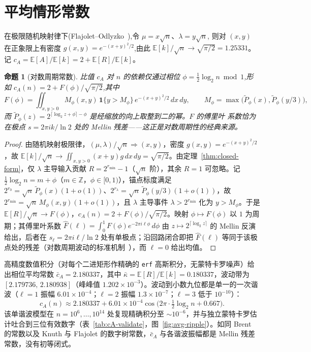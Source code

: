 \documentclass[11pt]{ctexart}
\newtheorem{proposition}[theorem]{命题}
\begin{document}
\section{平均情形常数}
\label{sec:average}

在极限随机映射律下(Flajolet--Odlyzko~\cite{flajolet}),令 $\mu=x\sqrt n$、$\lambda=y\sqrt n$,
则对 $(x,y)$ 在正象限上有密度 $g(x,y)=e^{-(x+y)^2/2}$,由此
$\mathbb E[k]/\sqrt n\to\sqrt{\pi/2}=1.25331$。记
$c_A=\mathbb E[A]/\mathbb E[k]=2+\mathbb E[R]/\mathbb E[k]$。

\begin{proposition}[对数周期常数]
\label{prop:cA}
比值 $c_A$ 对 $n$ 的依赖仅通过相位 $\phi=\tfrac12\log_2 n\bmod 1$,形如
$c_A(n)=2+F(\phi)/\sqrt{\pi/2}$,其中
\[
F(\phi)=\iint_{x,y>0} M_\phi(x,y)\,\mathbf 1\{y>M_\phi\}\,e^{-(x+y)^2/2}\,dx\,dy,
\qquad M_\phi=\max\!\big(\tilde P_\phi(x),\tilde P_\phi(y/3)\big),
\]
而 $\tilde P_\phi(z)=2^{\lceil\log_2 z+\phi\rceil-\phi}$ 是经缩放的向上取整到二的幂。$F$ 的傅里叶
系数恰为在极点 $s=2\pi i k/\ln 2$ 处的 Mellin 残差——这正是对数周期性的经典来源。
\end{proposition}

\begin{proof}
由随机映射极限律，$(\mu,\lambda)/\sqrt n\Rightarrow(x,y)$，密度 $g(x,y)=e^{-(x+y)^2/2}$，故 $\mathbb E[k]/\sqrt n\to\iint_{x,y>0}(x+y)g\,dx\,dy=\sqrt{\pi/2}$。由定理~\ref{thm:closed-form}，仅 $\lambda$ 主导输入贡献 $R=2^{r_{\min}}-1$（$\sqrt n$ 阶），其余 $R=1$ 可忽略。记 $\tfrac12\log_2 n=m+\phi$（$m\in\mathbb Z$，$\phi\in[0,1)$），锚点标度满足 $2^{r_0}=\sqrt n\,\tilde P_\phi(x)(1+o(1))$、$2^{r_\lambda}=\sqrt n\,\tilde P_\phi(y/3)(1+o(1))$，故 $2^{r_{\min}}=\sqrt n\,M_\phi(x,y)(1+o(1))$，且 $\lambda$ 主导事件 $\lambda>2^{r_{\min}}$ 化为 $y>M_\phi$。于是 $\mathbb E[R]/\sqrt n\to F(\phi)$，$c_A(n)=2+F(\phi)/\sqrt{\pi/2}$。映射 $\phi\mapsto F(\phi)$ 以 $1$ 为周期；其傅里叶系数 $\hat F(\ell)=\int_0^1 F(\phi)e^{-2\pi i\ell\phi}\,d\phi$ 由 $z\mapsto 2^{\lceil\log_2 z\rceil}$ 的 Mellin 反演给出，后者在 $s_\ell=2\pi i\ell/\ln 2$ 处有单极点；沿回路闭合即把 $\hat F(\ell)$ 等同于该极点处的残差（对数周期波动的标准机制~\cite{flajolet,sedgewick2013}），而 $\ell=0$ 给出均值。
\end{proof}

高精度数值积分（对每个二进矩形作精确的 \texttt{erf} 高斯积分，无蒙特卡罗噪声）给出相位平均常数 $\bar c_A=2.180337$，其中 $\bar\kappa=\mathbb E[R]/\mathbb E[k]=0.180337$，波动带为 $[2.179736,\,2.180938]$（峰峰值 $1.202\times10^{-3}$）。波动到小数九位都是单一的一次谐波（$\ell{=}1$ 振幅 $6.01\times10^{-4}$；$\ell{=}2$ 振幅 $1.3\times10^{-7}$；$\ell{=}3$ 低于 $10^{-10}$）：
\[
\boxed{\;c_A(n)\approx 2.180337+6.01\times10^{-4}\cos\!\big(2\pi\cdot\tfrac12\log_2 n+0.667\big).\;}
\]
该单谐波模型在 $n=10^6,\dots,10^{14}$ 处复现精确积分至 $\sim10^{-6}$，并与独立蒙特卡罗估计吐合到三位有效数字（表~\ref{tab:cA-validate}，图~\ref{fig:avg-ripple}）。如同 Brent 的常数以及 Knuth 与 Flajolet 的数字树常数，$\bar c_A$ 与各谐波振幅都是 Mellin 残差常数，没有初等闭式。
\end{document}
